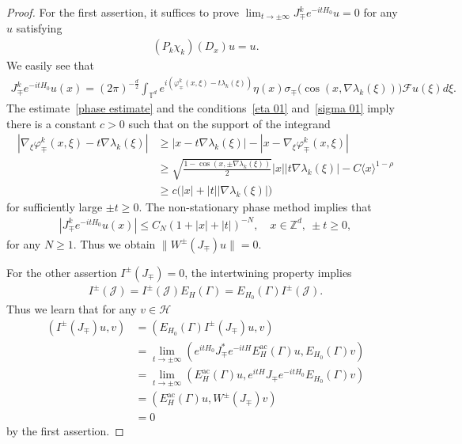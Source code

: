 \documentclass[10pt]{amsart}
\theoremstyle{definition}\newtheorem{defi}[theo]{Definition}\newtheorem{rema}[theo]{Remark}\newtheorem{exam}[theo]{Example}\newtheorem{exem}[theo]{Example}\newtheorem{nota}[theo]{Notation}
\newcommand{\f}{\varphi}
\newcommand{\x}{\xi}
\newcommand{\s}{\sigma}
\newcommand{\Z}{\mathbb{Z}}
\newcommand{\T}{\mathbb{T}}
\newcommand{\HS}{\mathcal{H}}
\newcommand{\JS}{\mathcal{J}}
\newcommand{\FS}{\mathcal{F}}
\newcommand{\ac}{\mathrm{ac}}
\newcommand{\jap}[1]{\langle #1 \rangle}
\begin{document}
\begin{proof}
For the first assertion, it suffices to prove $\lim_{t\to\pm\infty} J_\mp^k e^{-itH_0}u=0$ for any $u$ satisfying
\begin{align*}
(P_k\chi_k)(D_x)u=u.
\end{align*}
We easily see that
\begin{align*}
J_\mp^k e^{-itH_0} u(x) 
=(2\pi)^{-\frac{d}{2}} \int_{\T^d} e^{i\left(\f_\mp^k(x,\x)-t\lambda_k(\x)\right)} \eta(x)\s_\mp\bigl(\cos(x,\nabla\lambda_k(\x))\bigr) \FS u(\x)d\x.
\end{align*}
The estimate~\eqref{phase estimate} and the conditions~\eqref{eta 01} and~\eqref{sigma 01} imply there is a constant $c>0$ such that on the support of the integrand
\begin{align*}
\left|\nabla_\x \f_\mp^k(x,\x)-t\nabla\lambda_k(\x)\right|
&\geq |x-t\nabla\lambda_k(\x)| - \left|x-\nabla_\x\f_\mp^k(x,\x)\right| \\
&\geq \sqrt{\frac{1-\cos(x,\pm\nabla\lambda_k(\x))}{2}}|x| |t\nabla\lambda_k(\x)| - C\jap{x}^{1-\rho} \\
&\geq c \big(|x| + |t| |\nabla\lambda_k(\x)|\big)
\end{align*}
for sufficiently large $\pm t \geq 0$. The non-stationary phase method implies that
\begin{align*}
\left|J_\mp^k e^{-itH_0} u(x)\right|\leq C_{N}(1+|x|+|t|)^{-N}, \quad x\in\Z^d,\ \pm t \geq0,
\end{align*}
for any $N\geq1$. Thus we obtain $\|W^\pm(J_\mp)u\| = 0$.

For the other assertion $I^\pm(J_\mp) = 0$, the intertwining property implies
\begin{align*}
I^\pm(\JS)=I^\pm(\JS) E_H(\Gamma) = E_{H_0}(\Gamma) I^\pm(\JS).
\end{align*}
Thus we learn that for any $v\in\HS$
\begin{align*}
\left(I^\pm(J_\mp)u, v\right) &= \left(E_{H_0}(\Gamma) I^\pm(J_\mp)u, v\right) \\
&= \lim_{t\to\pm\infty} \left(e^{itH_0} J_\mp^* e^{-itH} E_{H}^{\ac}(\Gamma) u, E_{H_0}(\Gamma) v\right) \\
&= \lim_{t\to\pm\infty} \left(E_{H}^{\ac}(\Gamma) u, e^{itH} J_\mp e^{-itH_0} E_{H_0}(\Gamma) v\right) \\
&= \left(E_{H}^{\ac}(\Gamma) u, W^\pm(J_\mp) v\right) \\
&= 0
\end{align*}
by the first assertion.
\end{proof}
\end{document}
